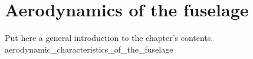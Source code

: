 \documentclass[[12pt,twoside]{book}
\begin{document}
%
%
\chapter%
   [Aerodynamics of the fuselage ]%
   {Aerodynamics of the fuselage }
\label{chap:Wing}

\setcounter{minitocdepth}{2}%
\minitoc %

\vspace{\baselineskip}

\noindent
Put here a general introduction to the chapter's contents.
%
{aerodynamic_characteristics_of_the_fuselage}
\end{document}
